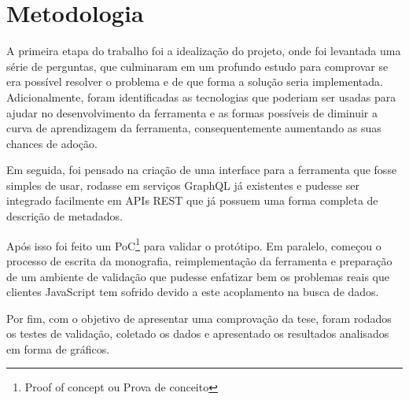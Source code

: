 \section[Metodologia]{Metodologia}

A primeira etapa do trabalho foi a idealização do projeto, onde foi levantada uma série de perguntas, que culminaram em um profundo estudo para comprovar se era possível resolver o problema e de que forma a solução seria implementada. Adicionalmente, foram identificadas as tecnologias que poderiam ser usadas para ajudar no desenvolvimento da ferramenta e as formas possíveis de diminuir a curva de aprendizagem da ferramenta, consequentemente aumentando as suas chances de adoção.

Em seguida, foi pensado na criação de uma interface para a ferramenta que fosse simples de usar, rodasse em serviços GraphQL já existentes e pudesse ser integrado facilmente em APIs REST que já possuem uma forma completa de descrição de metadados.

Após isso foi feito um PoC\footnote{
  Proof of concept ou Prova de conceito
} para validar o protótipo. Em paralelo, começou o processo de escrita da monografia, reimplementação da ferramenta e preparação de um ambiente de validação que pudesse enfatizar bem os problemas reais que clientes JavaScript tem sofrido devido a este acoplamento na busca de dados. 

Por fim, com o objetivo de apresentar uma comprovação da tese, foram rodados os testes de validação, coletado os dados e apresentado os resultados analisados em forma de gráficos.